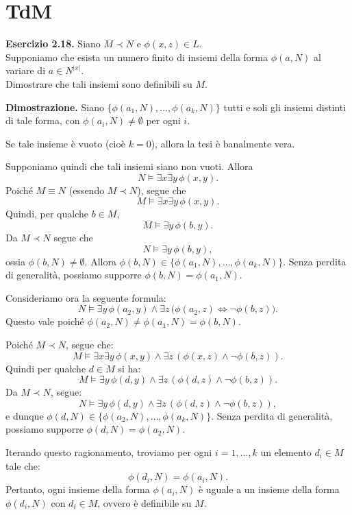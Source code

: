 \documentclass{book}
\begin{document}
\chapter{TdM}
    

\textbf{Esercizio 2.18.} Siano $M \prec N$ e $\phi(x,z) \in L$.\\
Supponiamo che esista un numero finito di insiemi della forma $\phi(a,N)$ al variare di $a \in N^{|x|}$.\\
Dimostrare che tali insiemi sono definibili su $M$.

\bigskip

\textbf{Dimostrazione.} 
Siano $\{\phi(a_1,N), \ldots, \phi(a_k,N)\}$ tutti e soli gli insiemi distinti di tale forma, con $\phi(a_i,N) \neq \emptyset$ per ogni $i$.

Se tale insieme è vuoto (cioè $k = 0$), allora la tesi è banalmente vera.

Supponiamo quindi che tali insiemi siano non vuoti. Allora
\[
N \models \exists x \exists y\, \phi(x,y).
\]
Poiché $M \equiv N$ (essendo $M \prec N$), segue che
\[
M \models \exists x \exists y\, \phi(x,y).
\]
Quindi, per qualche $b \in M$,
\[
M \models \exists y\, \phi(b,y).
\]
Da $M \prec N$ segue che
\[
N \models \exists y\, \phi(b,y),
\]
ossia $\phi(b,N) \neq \emptyset$. Allora $\phi(b,N) \in \{\phi(a_1,N), \ldots, \phi(a_k,N)\}$. Senza perdita di generalità, possiamo supporre $\phi(b,N) = \phi(a_1,N)$.

Consideriamo ora la seguente formula:
\[
N \models \exists y\, \phi(a_2,y) \land \exists z\, \big( \phi(a_2,z) \iff \neg \phi(b,z) \big).
\]
Questo vale poiché $\phi(a_2,N) \neq \phi(a_1,N) = \phi(b,N)$.

Poiché $M \prec N$, segue che:
\[
M \models \exists x \exists y\, \phi(x,y) \land \exists z\, ( \phi(x,z) \land \neg \phi(b,z) ).
\]
Quindi per qualche $d \in M$ si ha:
\[
M \models \exists y\, \phi(d,y) \land \exists z\, ( \phi(d,z) \land \neg \phi(b,z) ).
\]
Da $M \prec N$, segue:
\[
N \models \exists y\, \phi(d,y) \land \exists z\, ( \phi(d,z) \land \neg \phi(b,z) ),
\]
e dunque $\phi(d,N) \in \{\phi(a_2,N), \ldots, \phi(a_k,N)\}$. Senza perdita di generalità, possiamo supporre $\phi(d,N) = \phi(a_2,N)$.

Iterando questo ragionamento, troviamo per ogni $i = 1, \ldots, k$ un elemento $d_i \in M$ tale che:
\[
\phi(d_i,N) = \phi(a_i,N).
\]
Pertanto, ogni insieme della forma $\phi(a_i,N)$ è uguale a un insieme della forma $\phi(d_i,N)$ con $d_i \in M$, ovvero è definibile su $M$.
\end{document}
